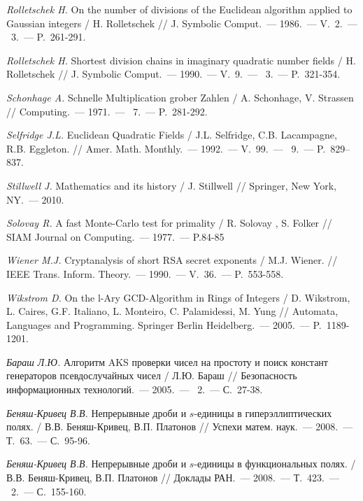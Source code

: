 \begin{thebibliography}{99}
    \textit{Rolletschek H.} On the number of divisions of the Euclidean algorithm applied to Gaussian integers / H. Rolletschek // J. Symbolic Comput.~--- 1986.~--- V.~2.~--- \textnumero~3.~--- P.~261-291.
    
    \textit{Rolletschek H.} Shortest division chains in imaginary quadratic number fields / H. Rolletschek // J. Symbolic Comput.~--- 1990.~--- V.~9.~--- {\textnumero}~3.~--- P.~321-354.

    \textit{Schonhage A.} Schnelle Multiplication grober Zahlen / A. Schonhage, V. Strassen // Computing.~--- 1971.~--- {\textnumero}~7.~--- P.~281-292.

    \textit{Selfridge J.L.} Euclidean Quadratic Fields / J.L. Selfridge, C.B. Lacampagne, R.B. Eggleton. // Amer. Math. Monthly.~--- 1992.~--- V.~99.~--- {\textnumero}~9.~--- P.~829--837.

    \textit{Stillwell J.} Mathematics and its history / J. Stillwell // Springer, New York, NY.~--- 2010.

    \textit{Solovay R.} A fast Monte-Carlo test for primality / R. Solovay , S. Folker // SIAM Journal on Computing.~--- 1977.~--- P.84-85
    
    \textit{Wiener M.J.} Cryptanalysis of short RSA secret exponents / M.J. Wiener. // IEEE Trans. Inform. Theory.~--- 1990.~--- V.~36.~--- P.~553-558.

    \textit{Wikstrom D.} On the l-Ary GCD-Algorithm in Rings of Integers / D. Wikstrom, L. Caires, G.F. Italiano, L. Monteiro, C. Palamidessi, M. Yung // Automata, Languages and Programming. Springer Berlin Heidelberg.~--- 2005.~--- P.~1189-1201.

    \textit{Бараш Л.Ю.} Алгоритм AKS проверки чисел на простоту и поиск констант генераторов псевдослучайных чисел / Л.Ю. Бараш // Безопасность информационных технологий.~--- 2005.~--- \textnumero~2.~--- С.~27-38.

    \textit{Беняш-Кривец В.В.} Непрерывные дроби и $s$-единицы в гиперэллиптических полях. / В.В. Беняш-Кривец, В.П. Платонов // Успехи матем. наук.~--- 2008.~--- Т.~63.~--- С.~95-96.
    
    \textit{Беняш-Кривец В.В.} Непрерывные дроби и $s$-единицы в функциональных полях. / В.В. Беняш-Кривец, В.П. Платонов // Доклады РАН.~--- 2008.~--- Т.~423.~--- \textnumero~2.~--- С.~155-160.


\end{thebibliography}

